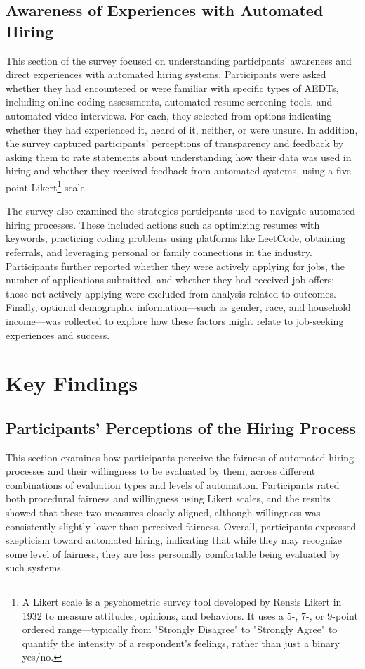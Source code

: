 \subsection{Awareness of Experiences with Automated Hiring}
This section of the survey focused on understanding participants' awareness and direct experiences with automated hiring systems. Participants were asked whether they had encountered or were familiar with specific types of AEDTs, including online coding assessments, automated resume screening tools, and automated video interviews. For each, they selected from options indicating whether they had experienced it, heard of it, neither, or were unsure. In addition, the survey captured participants' perceptions of transparency and feedback by asking them to rate statements about understanding how their data was used in hiring and whether they received feedback from automated systems, using a five-point Likert\footnote{A Likert scale is a psychometric survey tool developed by Rensis Likert in 1932 to measure attitudes, opinions, and behaviors. It uses a 5-, 7-, or 9-point ordered range—typically from "Strongly Disagree" to "Strongly Agree" to quantify the intensity of a respondent's feelings, rather than just a binary yes/no.} scale.

The survey also examined the strategies participants used to navigate automated hiring processes. These included actions such as optimizing resumes with keywords, practicing coding problems using platforms like LeetCode, obtaining referrals, and leveraging personal or family connections in the industry. Participants further reported whether they were actively applying for jobs, the number of applications submitted, and whether they had received job offers; those not actively applying were excluded from analysis related to outcomes. Finally, optional demographic information—such as gender, race, and household income—was collected to explore how these factors might relate to job-seeking experiences and success.

\section{Key Findings}
\subsection{Participants’ Perceptions of the Hiring Process}
This section examines how participants perceive the fairness of automated hiring processes and their willingness to be evaluated by them, across different combinations of evaluation types and levels of automation. Participants rated both procedural fairness and willingness using Likert scales, and the results showed that these two measures closely aligned, although willingness was consistently slightly lower than perceived fairness. Overall, participants expressed skepticism toward automated hiring, indicating that while they may recognize some level of fairness, they are less personally comfortable being evaluated by such systems.

